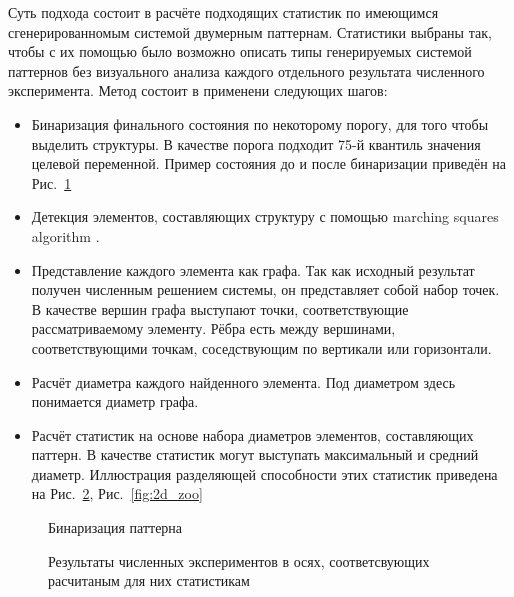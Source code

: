 Суть подхода состоит в расчёте подходящих статистик по имеющимся сгенерированномым системой двумерным паттернам. Статистики выбраны так, чтобы с их помощью было возможно описать типы генерируемых системой паттернов без визуального анализа каждого отдельного результата численного эксперимента. Метод состоит в применени следующих шагов:
\begin{itemize}
    \item Бинаризация финального состояния по некоторому порогу, для того чтобы выделить структуры. В качестве порога подходит 75-й квантиль значения целевой переменной. Пример состояния до и после бинаризации приведён на Рис.~\ref{fig:2d_patt_bin}
    \item Детекция элементов, составляющих структуру с помощью marching squares algorithm \cite{we1987marching}.
    \item Представление каждого элемента как графа. Так как исходный результат получен численным решением системы, он представляет собой набор точек. В качестве вершин графа выступают точки, соответствующие рассматриваемому элементу. Рёбра есть между вершинами, соответствующими точкам, соседствующим по вертикали или горизонтали. 
    \item Расчёт диаметра каждого найденного элемента. Под диаметром здесь понимается диаметр графа.
    \item Расчёт статистик на основе набора диаметров элементов, составляющих паттерн. В качестве статистик могут выступать максимальный и средний диаметр. Иллюстрация разделяющей способности этих статистик приведена на Рис.~\ref{fig:2d_stats}, Рис.~\ref{fig:2d_zoo} 
\end{itemize}

\begin{figure}[ht]
    \caption{Бинаризация паттерна}\label{fig:2d_patt_bin}
\end{figure}

\begin{figure}[ht]
    \caption{Результаты численных экспериментов в осях, соответсвующих расчитаным для них статистикам}\label{fig:2d_stats}
\end{figure}

